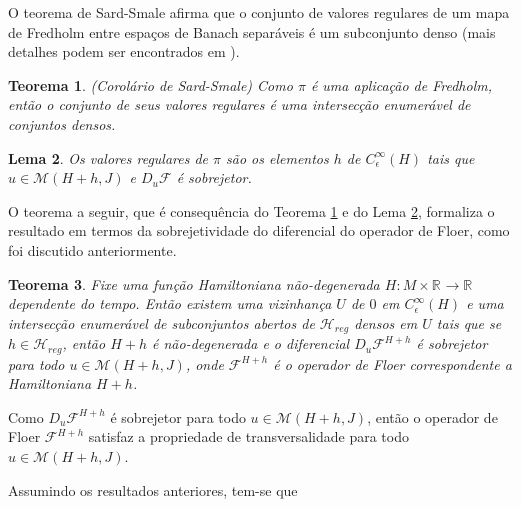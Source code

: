 \documentclass[12pt]{book}
\newtheorem{teorema}{Teorema}[section]
\newtheorem{lema}[teorema]{Lema}
\newcommand{\diferencialfloerponto}[1]{D_{#1}\operadorFloer}
\newcommand{\energiafinitaM}{\mathcal{M}}
\newcommand{\energiafinitaMHamiltoniana}[1]{\energiafinitaM(#1, J)}
\newcommand{\hamiltonianasRegulares}{\mathcal{H}_{reg}}
\newcommand{\operadorFloer}{\mathcal{F}}
\newcommand{\paresregulares}{\mathcal{H}_{reg}}
\newcommand{\perturbacaoHamiltoniana}[1]{C^{\infty}_{\epsilon}(#1)}
\newcommand{\real}[1]{\mathbb{R}^{#1}}
\newcommand{\reta}{\real{}}
\begin{document}
	O teorema de Sard-Smale afirma que o conjunto de valores regulares de um mapa de Fredholm entre espaços de Banach separáveis é um subconjunto denso (mais detalhes podem ser encontrados em \cite{audi_floer_homology}).
	
	\begin{teorema}\label{teorema_sard_smale}
		(Corolário de Sard-Smale) Como $\pi$ é uma aplicação de Fredholm, então o conjunto de seus valores regulares é uma intersecção enumerável de conjuntos densos.
	\end{teorema}
	
	\begin{lema}\label{lema_valores_regular_pi}
		Os valores regulares de $\pi$ são os elementos $h$ de $\perturbacaoHamiltoniana{H}$ tais que $u\in \energiafinitaM(H+h, J)$ e $\diferencialfloerponto{u}$ é sobrejetor.
	\end{lema}

	O teorema a seguir, que é consequência do Teorema \ref{teorema_sard_smale} e do Lema \ref{lema_valores_regular_pi}, formaliza o resultado em termos da sobrejetividade do diferencial do operador de Floer, como foi discutido anteriormente.
	
	\begin{teorema}\label{teorema_sobrejetividade_DF_todo_u}
		Fixe uma função Hamiltoniana não-degenerada $H:M\times \reta\to \reta$ dependente do tempo. Então existem uma vizinhança $U$ de $0$ em $\perturbacaoHamiltoniana{H}$ e uma intersecção enumerável de subconjuntos abertos de $\hamiltonianasRegulares$ densos em $U$ tais que se $h\in \paresregulares$, então $H+h$ é não-degenerada e o diferencial $\diferencialfloerponto{u}^{H+h}$ é sobrejetor para todo $u \in \energiafinitaMHamiltoniana{H+h}$, onde $\operadorFloer^{H+h}$ é o operador de Floer correspondente a Hamiltoniana $H+h$.
	\end{teorema}
	
	Como $\diferencialfloerponto{u}^{H+h}$ é sobrejetor para todo $u \in \energiafinitaMHamiltoniana{H+h}$, então o operador de Floer $\operadorFloer^{H+h}$ satisfaz a propriedade de transversalidade para todo $u \in \energiafinitaMHamiltoniana{H+h}$.

	Assumindo os resultados anteriores, tem-se que 
	
\end{document}
